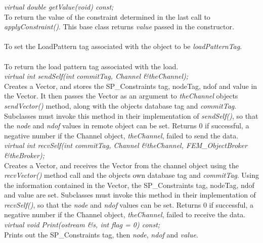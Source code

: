 {\em virtual double getValue(void) const;} \\
To return the value of the constraint determined in the last call to
{\em applyConstraint()}. This base class returns {\em value} passed in
the constructor.  \\ 

\\
To set the LoadPattern tag associated with the object to be {\em
loadPatternTag}. \\

\\ 
To return the load pattern tag associated with the load. \\

{\em virtual int sendSelf(int commitTag, Channel \&theChannel);} \\ 
Creates a Vector, and stores the SP\_Constraints tag, nodeTag, ndof and value in
the Vector. It then passes the Vector as an argument to {\em
theChannel} objects {\em sendVector()} method, along with the objects 
database tag and {\em commitTag}. Subclasses must invoke this method
in their implementation of {\em sendSelf()}, so that the {\em node}
and {\em ndof} values in remote object can be set. Returns $0$ if
successful, a negative number if the Channel object, {\em theChannel},
failed to send the data. \\ 

{\em virtual int recvSelf(int commitTag, Channel \&theChannel, FEM\_ObjectBroker
\&theBroker);} \\ 
Creates a Vector, and receives the Vector from the channel object
using the {\em recvVector()} method call and the objects own database
tag and {\em commitTag}. Using the information contained in the Vector, the 
SP\_Constraints tag, nodeTag, ndof and value are set. Subclasses must
invoke this method in their implementation of {\em recvSelf()}, so
that the {\em node} and {\em ndof} values can be set. Returns $0$ if
successful, a negative number if the Channel object, {\em
theChannel}, failed to receive the data. \\   

{\em virtual void Print(ostream \&s, int flag = 0) const;} \\
Prints out the SP\_Constraints tag, then {\em node}, {\em ndof} and
{\em value}. 

